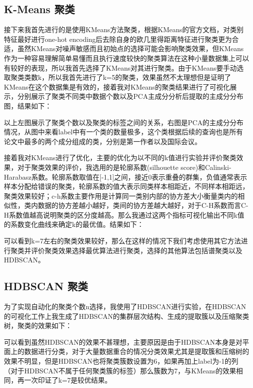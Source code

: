 \subsection{K-Means 聚类}

接下来我首先进行的是使用KMeans方法聚类，根据KMeans的官方文档，对类别特征最好进行one-hot encoding后去除自身的欧几里得距离特征进行聚类更为合适，虽然KMeans对噪声敏感而且初始点的选择可能会影响聚类效果，但KMeans作为一种容易理解简单易懂而且执行速度较快的聚类算法在这种小量数据集上可以有较好的表现，所以我首先选择了KMeans对其进行聚类。由于KMeans要手动选取聚类类数k，所以我首先进行了k=5的聚类，效果虽然不太理想但是证明了KMeans在这个数据集是有效的，接着我对KMeans的聚类结果进行了可视化展示，分别展示了聚类不同类中数据个数以及PCA主成分分析后提取的主成分分布图，结果如下：



以上左图展示了聚类个数以及聚类的标签之间的关系，右图是PCA的主成分分布情况，从图中来看label中有一个类的数量极多，这个类根据后续的查询也是所有论文中最多的两个成分组成的类，分别是第一作者以及国际会议。

接着我对KMeans进行了优化，主要的优化为以不同的k值进行实验并评价聚类效果，对于聚类效果的评价，我选用的是轮廓系数(silhouette score)和Calinski-Harabasz系数。轮廓系数取值在[-1,1]之间，接近0表示重叠的群集，负值通常表示样本分配给错误的聚类，轮廓系数的值大表示同类样本相距近，不同样本相距远，聚类效果较好；c-h系数主要作用是计算同一类别内部的协方差大小衡量类内的相似性，类内数据的协方差越小越好，类间的协方差越大越好，对于C-H系数而言C-H系数值越高说明聚类的区分度越高。那么我通过这两个指标可视化输出不同k值的系数变化曲线来确定k的最优值。结果如下：



可以看到k=7左右的聚类效果较好，那么在这样的情况下我们考虑使用其它方法进行聚类并评价聚类效果选择最优算法进行聚类，选择的其他算法包括谱聚类以及HDBSCAN。

\subsection{HDBSCAN 聚类}

为了实现自动化的聚类个数n选择，我使用了HDBSCAN进行实验，在HDBSCAN的可视化工作上我生成了HDBSCAN的集群层次结构、生成的提取簇以及压缩聚类树，聚类的效果如下：



可以看到虽然HDBSCAN的效果不甚理想，主要原因是由于HDBSCAN本身是对平面上的数据进行分类，对于大量数据重合的情况分类效果尤其是提取簇和压缩树的效果不明显，但是HDBSCAN也将聚类簇数设置为6，如果再加上label为-1的列（对于HDBSCAN不属于任何聚类簇的标签）那么簇数为7，与KMeans的效果相同，再一次印证了k=7是较优结果。

